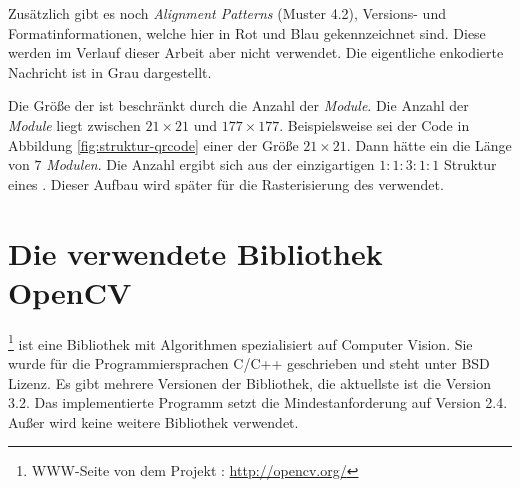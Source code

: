 Zusätzlich gibt es noch \emph{Alignment Patterns} (Muster 4.2), Versions- und Formatinformationen, welche hier in Rot und Blau gekennzeichnet sind. Diese werden im Verlauf dieser Arbeit aber nicht verwendet. Die eigentliche enkodierte Nachricht ist in Grau dargestellt.

Die Größe der \QRCodes ist beschränkt durch die Anzahl der \emph{Module}. Die Anzahl der \emph{Module} liegt zwischen $21 \times 21$ und $177 \times 177$. Beispielsweise sei der Code in Abbildung \ref{fig:struktur-qrcode} einer der Größe $21 \times 21$. Dann hätte ein \emph{\fp} die Länge von $7$ \emph{Modulen}. Die Anzahl ergibt sich aus der einzigartigen $1:1:3:1:1$ Struktur eines \emph{\fps}. Dieser Aufbau wird später für die Rasterisierung des \QRCodes verwendet.

\section{Die verwendete Bibliothek OpenCV}
\OpenCV\footnote{WWW-Seite von dem Projekt \OpenCV: \url{http://opencv.org/}} ist eine Bibliothek mit Algorithmen spezialisiert auf \glqq Computer Vision\grqq . Sie wurde für die Programmiersprachen C/C++ geschrieben und steht unter BSD Lizenz. Es gibt mehrere Versionen der Bibliothek, die aktuellste ist die Version 3.2. Das implementierte Programm setzt die Mindestanforderung auf Version 2.4. Außer \OpenCV wird keine weitere Bibliothek verwendet.